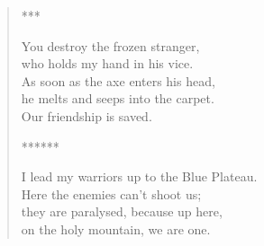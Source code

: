 \begin{verse}
***

You destroy the frozen stranger,\\
who holds my hand in his vice.\\
As soon as the axe enters his head,\\
he melts and seeps into the carpet.\\
Our friendship is saved.

******

I lead my warriors up to the Blue Plateau.\\
Here the enemies can't shoot us;\\
they are paralysed, because up here,\\
on the holy mountain, we are one.
\end{verse}

